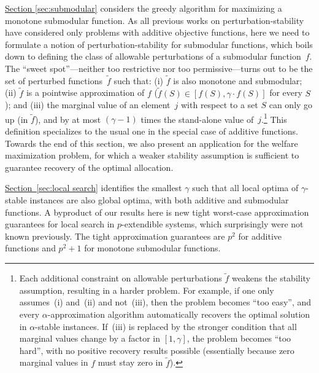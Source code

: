 \hyperref[sec:submodular]{Section \ref{sec:submodular}} considers the greedy algorithm for
maximizing a monotone submodular function.  As all previous works on
perturbation-stability have considered only problems with additive
objective functions, here we need to formulate a notion of
perturbation-stability for submodular functions, which boils down to
defining the class of allowable perturbations of a submodular
function~$f$.  The ``sweet spot''---neither too restrictive nor too
permissive---turns out to be the set of perturbed
functions~$\tilde{f}$ such that: (i) $\tilde{f}$ is also monotone and
submodular; (ii) $\tilde{f}$ is a pointwise approximation of $f$
($\tilde{f}(S) \in [f(S),\gamma \cdot f(S)]$ for every $S$); and (iii)
the marginal value of an element~$j$ with respect to a set $S$ can
only go up (in $\tilde{f}$), and by at most $(\gamma-1)$ times the
stand-alone value of~$j$.\footnote{Each additional constraint on
allowable perturbations $\tilde{f}$ weakens the stability assumption, resulting in a harder
  problem.  For example, if one only assumes~(i) and~(ii) and
  not~(iii), then the problem becomes ``too easy'', and every
  $\alpha$-approximation algorithm automatically recovers the optimal
  solution in $\alpha$-stable instances.  If~(iii) is replaced by the
  stronger condition that all marginal values change by a factor in
  $[1,\gamma]$, the problem becomes ``too hard'', with no positive
  recovery results possible (essentially because zero marginal values
  in $f$ must stay zero in $\tilde{f}$).}  
This definition specializes to the usual one in
the special case of additive functions.  
Towards the end of this section, we also present an application for the welfare maximization problem, for which a weaker stability assumption is sufficient to guarantee recovery of the optimal allocation.

\hyperref[sec:local search]{Section~\ref{sec:local search}} identifies the smallest $\gamma$ such
that all local optima of $\gamma$-stable instances are also global
optima, with both additive and submodular functions.  A byproduct of
our results here is new tight worst-case approximation guarantees for
local search in $p$-extendible systems, which surprisingly were not
known previously.  The tight approximation guarantees are $p^2$ for
additive functions and $p^2+1$ for monotone submodular functions.

